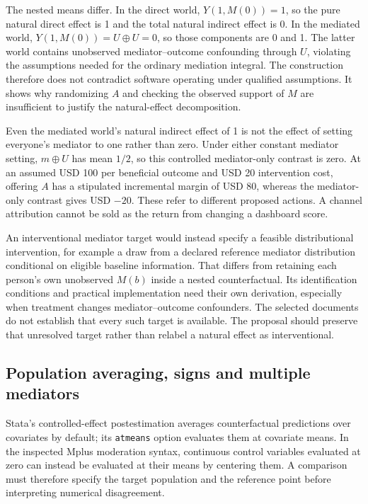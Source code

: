 The nested means differ. In the direct world, $Y(1,M(0))=1$, so the pure natural direct effect is 1 and the total natural indirect effect is 0. In the mediated world,
$Y(1,M(0))=U\oplus U=0$, so those components are 0 and 1. The latter world contains unobserved mediator--outcome confounding through $U$, violating the assumptions needed for the ordinary mediation integral. The construction therefore does not contradict software operating under qualified assumptions. It shows why randomizing $A$ and checking the observed support of $M$ are insufficient to justify the natural-effect decomposition.

Even the mediated world's natural indirect effect of 1 is not the effect of setting everyone's mediator to one rather than zero. Under either constant mediator setting, $m\oplus U$ has mean $1/2$, so this controlled mediator-only contrast is zero. At an assumed USD 100 per beneficial outcome and USD 20 intervention cost, offering $A$ has a stipulated incremental margin of USD 80, whereas the mediator-only contrast gives USD $-20$. These refer to different proposed actions. A channel attribution cannot be sold as the return from changing a dashboard score.

An interventional mediator target would instead specify a feasible distributional intervention, for example a draw from a declared reference mediator distribution conditional on eligible baseline information. That differs from retaining each person's own unobserved $M(b)$ inside a nested counterfactual. Its identification conditions and practical implementation need their own derivation, especially when treatment changes mediator--outcome confounders. The selected documents do not establish that every such target is available. The proposal should preserve that unresolved target rather than relabel a natural effect as interventional.

\subsection{Population averaging, signs and multiple mediators}
\label{exec20:med-population}
Stata's controlled-effect postestimation averages counterfactual predictions over covariates by default; its \texttt{atmeans} option evaluates them at covariate means. In the inspected Mplus moderation syntax, continuous control variables evaluated at zero can instead be evaluated at their means by centering them. A comparison must therefore specify the target population and the reference point before interpreting numerical disagreement.\citep{exec20_med_stata_post,exec20_med_mplus_ch17}

